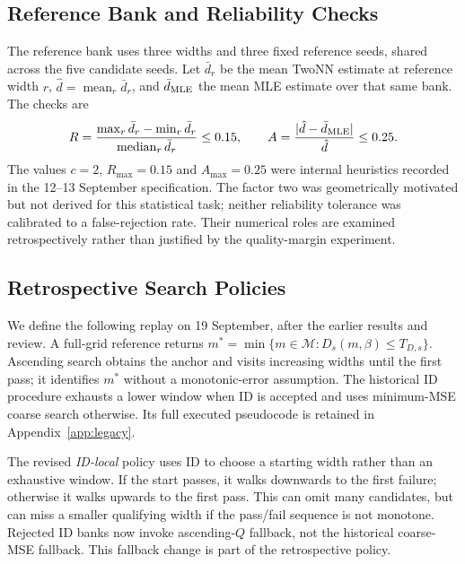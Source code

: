 \documentclass[make,article,submit,pdftex,moreauthors]{Definitions/mdpi}
\begin{document}
\subsection{Reference Bank and Reliability Checks}\label{sec:algorithm}
The reference bank uses three widths and
three fixed reference seeds, shared across the five candidate seeds.
Let $\bar d_r$ be the mean TwoNN estimate at reference width $r$,
$\hat d=\operatorname{mean}_r\bar d_r$, and $\bar d_{\rm MLE}$ the mean
MLE estimate over that same bank. The checks are
\begin{equation}
 R=\frac{\max_r\bar d_r-\min_r\bar d_r}{\operatorname{median}_r\bar d_r}
 \le0.15,\qquad
 A=\frac{|\hat d-\bar d_{\rm MLE}|}{\hat d}\le0.25.
 \label{eq:checks}
\end{equation}
The values $c=2$, $R_{\max}=0.15$ and $A_{\max}=0.25$ were internal
heuristics recorded in the 12--13 September specification. The factor
two was geometrically motivated but not derived for this statistical
task; neither reliability tolerance was calibrated to a false-rejection
rate. Their numerical roles are examined retrospectively rather than
justified by the quality-margin experiment.

\subsection{Retrospective Search Policies}\label{sec:replay}
We define the following replay on 19 September, after the earlier
results and review. A full-grid reference returns
$m^*=\min\{m\in\mathcal M:D_s(m,\beta)\le T_{D,s}\}$.
Ascending search obtains the anchor and visits increasing widths until
the first pass; it identifies $m^*$ without a monotonic-error assumption.
The historical ID procedure exhausts a lower window when ID is accepted
and uses minimum-MSE coarse search otherwise. Its full executed
pseudocode is retained in Appendix~\ref{app:legacy}.

The revised \emph{ID-local} policy uses ID to choose a starting width
rather than an exhaustive window. If the start passes, it walks
downwards to the first failure; otherwise it walks upwards to the first
pass. This can omit many candidates, but can miss a smaller qualifying
width if the pass/fail sequence is not monotone. Rejected ID banks now
invoke ascending-$Q$ fallback, not the historical coarse-MSE fallback.
This fallback change is part of the retrospective policy.
\end{document}
